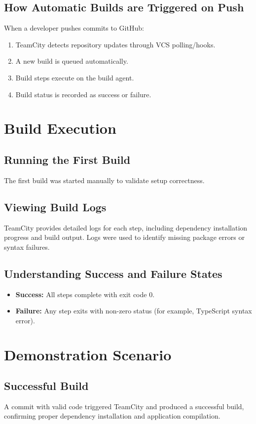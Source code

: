 \documentclass[12pt,a4paper]{report}
\begin{document}
\subsection{How Automatic Builds are Triggered on Push}
When a developer pushes commits to GitHub:
\begin{enumerate}[leftmargin=1.2cm]
    \item TeamCity detects repository updates through VCS polling/hooks.
    \item A new build is queued automatically.
    \item Build steps execute on the build agent.
    \item Build status is recorded as success or failure.
\end{enumerate}

\section{Build Execution}
\subsection{Running the First Build}
The first build was started manually to validate setup correctness.

\subsection{Viewing Build Logs}
TeamCity provides detailed logs for each step, including dependency installation progress and build output. Logs were used to identify missing package errors or syntax failures.

\subsection{Understanding Success and Failure States}
\begin{itemize}[leftmargin=1.2cm]
    \item \textbf{Success:} All steps complete with exit code 0.
    \item \textbf{Failure:} Any step exits with non-zero status (for example, TypeScript syntax error).
\end{itemize}

\section{Demonstration Scenario}
\subsection{Successful Build}
A commit with valid code triggered TeamCity and produced a successful build, confirming proper dependency installation and application compilation.
\end{document}

